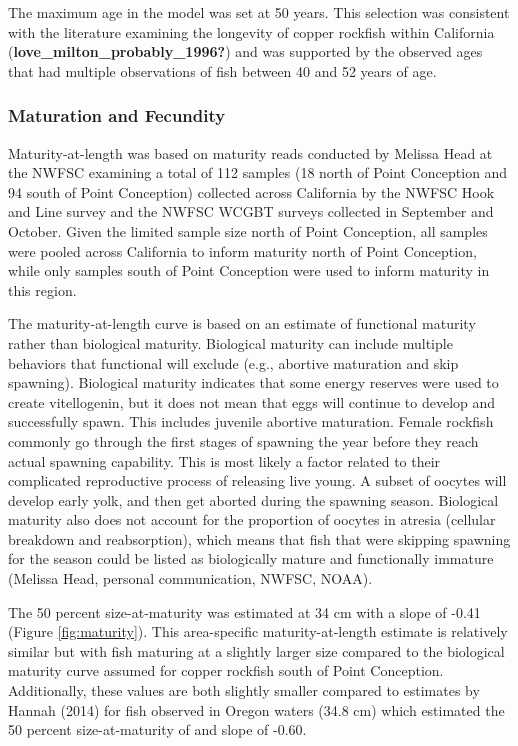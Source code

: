 \documentclass[11pt,
  english,
  letterpaper,
]{article}
\begin{document}
The maximum age in the model was set at 50 years. This selection was consistent with the literature examining the longevity of copper rockfish within California (\textbf{love\_milton\_probably\_1996?}) and was supported by the observed ages that had multiple observations of fish between 40 and 52 years of age.

\hypertarget{maturation-and-fecundity}{%
\subsubsection{Maturation and Fecundity}\label{maturation-and-fecundity}}

Maturity-at-length was based on maturity reads conducted by Melissa Head at the NWFSC examining a total of 112 samples (18 north of Point Conception and 94 south of Point Conception) collected across California by the NWFSC Hook and Line survey and the NWFSC WCGBT surveys collected in September and October. Given the limited sample size north of Point Conception, all samples were pooled across California to inform maturity north of Point Conception, while only samples south of Point Conception were used to inform maturity in this region.

The maturity-at-length curve is based on an estimate of functional maturity rather than biological maturity. Biological maturity can include multiple behaviors that functional will exclude (e.g., abortive maturation and skip spawning). Biological maturity indicates that some energy reserves were used to create vitellogenin, but it does not mean that eggs will continue to develop and successfully spawn. This includes juvenile abortive maturation. Female rockfish commonly go through the first stages of spawning the year before they reach actual spawning capability. This is most likely a factor related to their complicated reproductive process of releasing live young. A subset of oocytes will develop early yolk, and then get aborted during the spawning season. Biological maturity also does not account for the proportion of oocytes in atresia (cellular breakdown and reabsorption), which means that fish that were skipping spawning for the season could be listed as biologically mature and functionally immature (Melissa Head, personal communication, NWFSC, NOAA).

The 50 percent size-at-maturity was estimated at 34 cm with a slope of -0.41 (Figure \ref{fig:maturity}). This area-specific maturity-at-length estimate is relatively similar but with fish maturing at a slightly larger size compared to the biological maturity curve assumed for copper rockfish south of Point Conception. Additionally, these values are both slightly smaller compared to estimates by Hannah (2014) for fish observed in Oregon waters (34.8 cm) which estimated the 50 percent size-at-maturity of and slope of -0.60.
\end{document}
